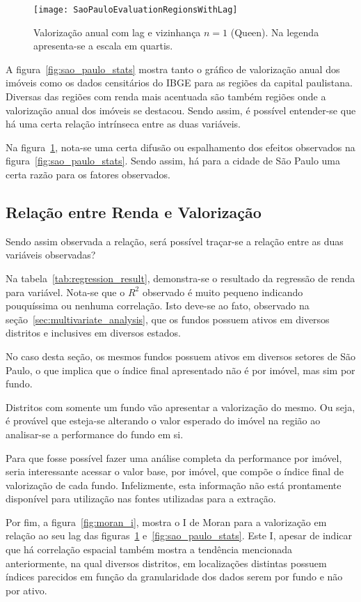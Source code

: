 \begin{center}
\begin{figure}
\begin{centering}
\texttt{[image: SaoPauloEvaluationRegionsWithLag]}
\par\end{centering}
\caption{\label{fig:sao_paulo_evaluation_with_lag} Valorização anual com lag e vizinhança $n=1$ (Queen). Na legenda apresenta-se a escala em quartis.} 
\end{figure}
\vspace*{-44pt}
\end{center}

A figura~\ref{fig:sao_paulo_stats} mostra tanto o gráfico de valorização anual dos imóveis como os dados censitários do IBGE para as regiões da capital paulistana. Diversas das regiões com renda mais acentuada são também regiões onde a valorização anual dos imóveis se destacou. Sendo assim, é possível entender-se que há uma certa relação intrínseca entre as duas variáveis.

Na figura~\ref{fig:sao_paulo_evaluation_with_lag}, nota-se uma certa difusão ou espalhamento dos efeitos observados na figura~\ref{fig:sao_paulo_stats}. Sendo assim, há para a cidade de São Paulo uma certa razão para os fatores observados.

\subsection{Relação entre Renda e Valorização}
\label{sec:income_evaluation}
Sendo assim observada a relação, será possível traçar-se a relação entre as duas variáveis observadas?

Na tabela~\ref{tab:regression_result}, demonstra-se o resultado da regressão de renda para variável. Nota-se que o $R^{2}$ observado é muito pequeno indicando pouquíssima ou nenhuma correlação. Isto deve-se ao fato, observado na seção~\ref{sec:multivariate_analysis}, que os fundos possuem ativos em diversos distritos e inclusives em diversos estados. 

No caso desta seção, os mesmos fundos possuem ativos em diversos setores de São Paulo, o que implica que o índice final apresentado não é por imóvel, mas sim por fundo. 

Distritos com somente um fundo vão apresentar a valorização do mesmo. Ou seja, é provável que esteja-se alterando o valor esperado do imóvel na região ao analisar-se a performance do fundo em si. 

Para que fosse possível fazer uma análise completa da performance por imóvel, seria interessante acessar o valor base, por imóvel, que compõe o índice final de valorização de cada fundo. Infelizmente, esta informação não está prontamente disponível para utilização nas fontes utilizadas para a extração.

Por fim, a figura~\ref{fig:moran_i}, mostra o I de Moran para a valorização em relação ao seu lag das figuras~\ref{fig:sao_paulo_evaluation_with_lag} e~\ref{fig:sao_paulo_stats}. Este I, apesar de indicar que há correlação espacial também mostra a tendência mencionada anteriormente, na qual diversos distritos, em localizações distintas possuem índices parecidos em função da granularidade dos dados serem por fundo e não por ativo.
